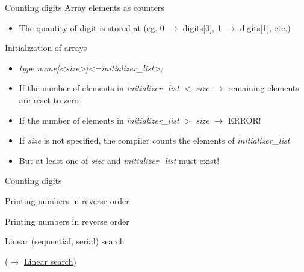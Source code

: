 \documentclass[usenames,dvipsnames,aspectratio=169]{beamer}
\begin{document}
\begin{frame}{Counting digits}
  Array elements as counters
  \begin{itemize}
    \item[] The quantity of digit  is stored at  (eg. 0 $\to$ digits[0], 1 $\to$ digits[1], etc.)
  \end{itemize}
  \vfill
  Initialization of arrays
  \begin{itemize}
    \item \emph{type name[<size>]<={initializer\_list}>;}
    \item If the number of elements in \emph{initializer\_list} $<$ \emph{size} $\to$ remaining elements are reset to zero
    \item If the number of elements in \emph{initializer\_list} $>$ \emph{size} $\to$ ERROR!
    \item If \emph{size} is not specified, the compiler counts the elements of \emph{initializer\_list}
    \item But at least one of \emph{size} and \emph{initializer\_list} must exist!
  \end{itemize}
\end{frame}

\begin{frame}{Counting digits}
    \begin{exampleblock}{}
    \tiny
    
  \end{exampleblock}
\end{frame}

\begin{frame}{Printing numbers in reverse order}
    \begin{exampleblock}{}
    \fontsize{8}{9} \selectfont
    
  \end{exampleblock}
\end{frame}

\begin{frame}{Printing numbers in reverse order}
    \begin{exampleblock}{}
    \scriptsize
    
  \end{exampleblock}
\end{frame}

\begin{frame}{Linear (sequential, serial) search}
    \begin{exampleblock}{ ($\to$ \href{https://en.wikipedia.org/wiki/Linear\_search}{Linear search})}
    \scriptsize
    
  \end{exampleblock}
\end{frame}
\end{document}
